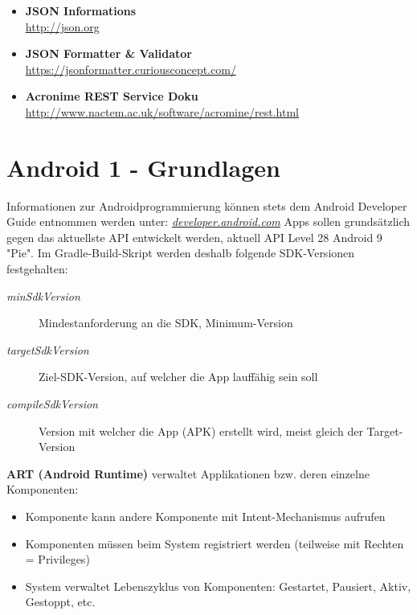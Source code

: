 \documentclass[a4paper]{article}
\begin{document}
\begin{itemize}
			\item \textbf{JSON Informations}\\
			\href{http://json.org}
			{http://json.org}
			
			\item \textbf{JSON Formatter \& Validator}\\
			\href{https://jsonformatter.curiousconcept.com/}
			{https://jsonformatter.curiousconcept.com/}
			
			\item \textbf{Acronime REST Service Doku}\\
			\href{http://www.nactem.ac.uk/software/acromine/rest.html}
			{http://www.nactem.ac.uk/software/acromine/rest.html}
			
		\end{itemize}
	
		\newpage
	
\section{Android 1 - Grundlagen}
	Informationen zur Androidprogrammierung können stets dem Android Developer Guide entnommen werden unter: \textit{\href{https://developer.android.com/}{developer.android.com}}
	Apps sollen grundsätzlich gegen das aktuellste API entwickelt werden, aktuell API Level 28 Android 9 "Pie".
	Im Gradle-Build-Skript werden deshalb folgende SDK-Versionen festgehalten:
\vspace{1em}
	\begin{description}
		\item[\textit{minSdkVersion}] Mindestanforderung an die SDK, Minimum-Version
		\item[\textit{targetSdkVersion}] Ziel-SDK-Version, auf welcher die App lauffähig sein soll
		\item[\textit{compileSdkVersion}] Version mit welcher die App (APK) erstellt wird, meist gleich der Target-Version	
	\end{description}
\vspace{1em}
	\textbf{ART (Android Runtime)} verwaltet Applikationen bzw. deren einzelne Komponenten:
	\begin{itemize}
		\item Komponente kann andere Komponente mit Intent-Mechanismus aufrufen
		\item Komponenten müssen beim System registriert werden (teilweise mit Rechten = Privileges)
		\item System verwaltet Lebenszyklus von Komponenten: Gestartet, Pausiert, Aktiv, Gestoppt, etc.
	\end{itemize}
\end{document}
